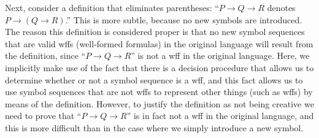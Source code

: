 Next, consider a definition that eliminates parentheses:  ``$P
\rightarrow Q\rightarrow R$ denotes $P\rightarrow (Q \rightarrow R)$.''
This is more subtle, because no new symbols are introduced.  The reason
this definition is considered proper is that no new symbol sequences
that are valid wffs (well-formed formulas) in the original language will result from the definition, since
``$P \rightarrow Q\rightarrow R$'' is not a wff in the original
language.  Here, we implicitly make use of the fact that there is a
decision procedure that allows us to determine whether or not a symbol
sequence is a wff, and this fact allows us to use symbol sequences that
are not wffs to represent other things (such as wffs) by means of the
definition.  However, to justify the definition as not being creative we
need to prove that ``$P \rightarrow Q\rightarrow R$'' is in fact not a
wff in the original language, and this is more difficult than in the
case where we simply introduce a new symbol.

